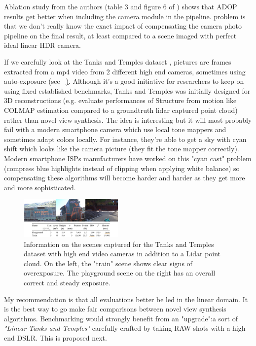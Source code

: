 Ablation study from the authors (table 3 and figure 6 of \cite{ruckert2022adop}) shows that ADOP results get better when including the camera module in the pipeline. problem is that we don't really know the exact impact of compensating the camera photo pipeline on the final result, at least compared to a scene imaged with perfect ideal linear HDR camera.

If we carefully look at the Tanks and Temples dataset \cite{Knapitsch2017TanksAndTemples}, pictures are frames extracted from a mp4 video from 2 different high end cameras, sometimes using auto-exposure (see ~\href{fig:tank_and_temples}). Although it's a good initiative for researchers to keep on using fixed established benchmarks, Tanks and Temples was initially designed for 3D reconstructions (e.g. evaluate performances of Structure from motion like COLMAP estimation compared to a groundtruth lidar captured point cloud) rather than novel view synthesis. The idea is interesting but it will most probably fail with a modern smartphone camera which use local tone mappers and sometimes adapt colors locally. For instance, they're able to get a sky with cyan shift which looks like the camera picture (they fit the tone mapper correctly). Modern smartphone ISPs manufacturers have worked on this "cyan cast" problem (compress blue highlights instead of clipping when applying white balance) so compensating these algorithms will become harder and harder as they get more and more sophisticated.


\begin{figure}[H]
    \centering
    \includegraphics[width=0.45\textwidth]{figures/tanks_and_temples.png}
    \caption{Information on the scenes captured for the Tanks and Temples dataset with high end video cameras in addition to a Lidar point cloud. On the left, the "train" scene shows clear signs of overexposure. The playground scene on the right has an overall correct and steady exposure.}
    \label{fig:tank_and_temples}
\end{figure}


My recommendation is that all evaluations better be led in the linear domain. It is the best way to go make fair comparisons between novel view synthesis algorithms. Benchmarking would strongly benefit from an "upgrade":a sort of \textit{"Linear Tanks and Temples"} carefully crafted by taking RAW shots with a high end DSLR. This is proposed next.

